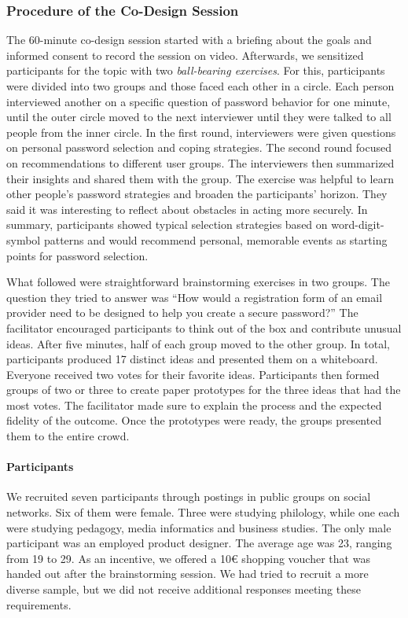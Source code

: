 \subsubsection{Procedure of the Co-Design Session}
The 60-minute co-design session started with a briefing about the goals and informed consent to record the session on video. Afterwards, we sensitized participants for the topic with two \textit{ball-bearing exercises}. For this, participants were divided into two groups and those faced each other in a circle. Each person interviewed another on a specific question of password behavior for one minute, until the outer circle moved to the next interviewer until they were talked to all people from the inner circle. In the first round, interviewers were given questions on personal password selection and coping strategies. The second round focused on recommendations to different user groups. The interviewers then summarized their insights and shared them with the group. The exercise was helpful to learn other people's password strategies and broaden the participants' horizon. They said it was interesting to reflect about obstacles in acting more securely. In summary, participants showed typical selection strategies based on word-digit-symbol patterns and would recommend personal, memorable events as starting points for password selection.

What followed were straightforward brainstorming exercises in two groups. The question they tried to answer was ``How would a registration form of an email provider need to be designed to help you create a secure password?'' The facilitator encouraged participants to think out of the box and contribute unusual ideas. After five minutes, half of each group moved to the other group. In total, participants produced 17 distinct ideas and presented them on a whiteboard. Everyone received two votes for their favorite ideas. Participants then formed groups of two or three to create paper prototypes for the three ideas that had the most votes. The facilitator made sure to explain the process and the expected fidelity of the outcome. Once the prototypes were ready, the groups presented them to the entire crowd.

\paragraph{Participants}
We recruited seven participants through postings in public groups on social networks. Six of them were female. Three were studying philology, while one each were studying pedagogy, media informatics and business studies. The only male participant was an employed product designer. The average age was 23, ranging from 19 to 29. As an incentive, we offered a 10€ shopping voucher that was handed out after the brainstorming session. We had tried to recruit a more diverse sample, but we did not receive additional responses meeting these requirements. 

